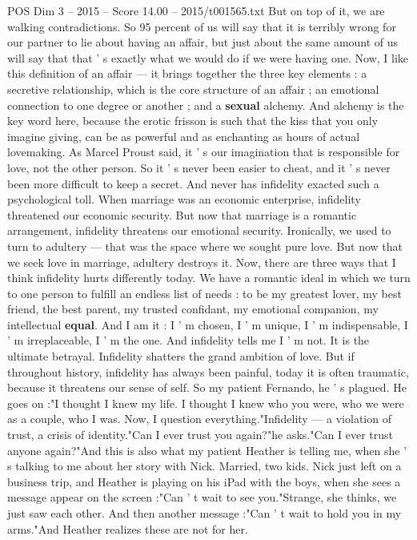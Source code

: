 \begin{textsample}{POS Dim 3 – 2015 – Score 14.00 – 2015/t001565.txt}
But on top of it, we are walking contradictions.
So 95 percent of us will say that it is terribly wrong for our partner to lie about having an affair, but just about the same amount of us will say that that ' s exactly what we would do if we were having one.
Now, I like this definition of an affair — it brings together the three key elements : a secretive relationship, which is the core structure of an affair ; an emotional connection to one degree or another ; and a \textbf{sexual} alchemy.
And alchemy is the key word here, because the erotic frisson is such that the kiss that you only imagine giving, can be as powerful and as enchanting as hours of actual lovemaking.
As Marcel Proust said, it ' s our imagination that is responsible for love, not the other person.
So it ' s never been easier to cheat, and it ' s never been more difficult to keep a secret.
And never has infidelity exacted such a psychological toll.
When marriage was an economic enterprise, infidelity threatened our economic security.
But now that marriage is a romantic arrangement, infidelity threatens our emotional security.
Ironically, we used to turn to adultery — that was the space where we sought pure love.
But now that we seek love in marriage, adultery destroys it.
Now, there are three ways that I think infidelity hurts differently today.
We have a romantic ideal in which we turn to one person to fulfill an endless list of needs : to be my greatest lover, my best friend, the best parent, my trusted confidant, my emotional companion, my intellectual \textbf{equal}.
And I am it : I ' m chosen, I ' m unique, I ' m indispensable, I ' m irreplaceable, I ' m the one.
And infidelity tells me I ' m not.
It is the ultimate betrayal.
Infidelity shatters the grand ambition of love.
But if throughout history, infidelity has always been painful, today it is often traumatic, because it threatens our sense of self.
So my patient Fernando, he ' s plagued.
He goes on :"I thought I knew my life.
I thought I knew who you were, who we were as a couple, who I was.
Now, I question everything."Infidelity — a violation of trust, a crisis of identity."Can I ever trust you again?"he asks."Can I ever trust anyone again?"And this is also what my patient Heather is telling me, when she ' s talking to me about her story with Nick.
Married, two kids.
Nick just left on a business trip, and Heather is playing on his iPad with the boys, when she sees a message appear on the screen :"Can ' t wait to see you."Strange, she thinks, we just saw each other.
And then another message :"Can ' t wait to hold you in my arms."And Heather realizes these are not for her.

\end{textsample}
